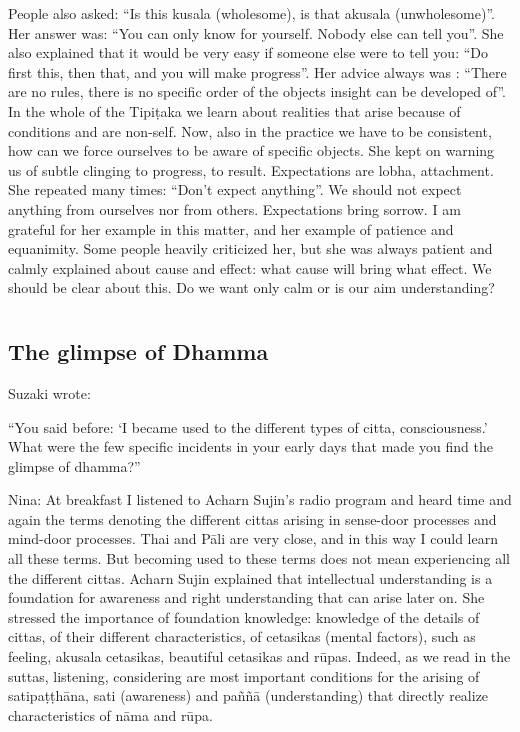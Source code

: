 People also asked: ``Is this kusala (wholesome), is that akusala (unwholesome)”. Her answer was: ``You can only know for yourself. Nobody else can tell you''. She also explained that it would be very easy if someone else were to tell you: ``Do first this, then that, and you will make progress''. Her advice always was : ``There are no rules, there is no specific order of the objects insight can be developed of''. In the whole of the Tipiṭaka we learn about realities that arise because of conditions and are non-self. Now, also in the practice we have to be consistent, how can we force ourselves to be aware of specific objects. She kept on warning us of subtle clinging to progress, to result. Expectations are lobha, attachment. She repeated many times: ``Don't expect anything''. We should not expect anything from ourselves nor from others. Expectations bring sorrow. I am grateful for her example in this matter, and her example of patience and equanimity. Some people heavily criticized her, but she was always patient and calmly explained about cause and effect: what cause will bring what effect. We should be clear about this. Do we want only calm or is our aim understanding?
















\chapter[The glimpse of Dhamma]{}
\section*{The glimpse of Dhamma}

Suzaki wrote:

``You said before: ‘I became used to the different types of citta, consciousness.’ What were the few specific incidents in your early days that made you find the glimpse of dhamma?''

Nina: At breakfast I listened to Acharn Sujin’s radio program and heard time and again the terms denoting the different cittas arising in sense-door processes and mind-door processes. Thai and Pāli are very close, and in this way I could learn all these terms. But becoming used to these terms does not mean experiencing all the different cittas. Acharn Sujin explained that intellectual understanding is a foundation for awareness and right understanding that can arise later on. She stressed the importance of foundation knowledge: knowledge of the details of cittas, of their different characteristics, of cetasikas (mental factors), such as feeling, akusala cetasikas, beautiful cetasikas and rūpas. Indeed, as we read in the suttas, listening, considering are most important conditions for the arising of satipaṭṭhāna, sati (awareness) and paññā (understanding) that directly realize characteristics of nāma and rūpa.

